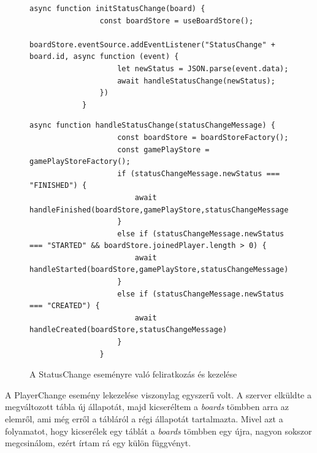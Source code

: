 \documentclass[a4paper,twoside]{article}
\begin{document}
\begin{figure}
	\caption{A StatusChange eseményre való feliratkozás és kezelése}
		\begin{minipage}{\textwidth}
			\begin{lstlisting}[style=javascriptStyle]
			async function initStatusChange(board) {
				const boardStore = useBoardStore();
				boardStore.eventSource.addEventListener("StatusChange" + board.id, async function (event) {
					let newStatus = JSON.parse(event.data);
					await handleStatusChange(newStatus);
				})
			}
			\end{lstlisting}
		\end{minipage}
		\begin{minipage}{\textwidth}
			\begin{lstlisting}[style=javascriptStyle]
				async function handleStatusChange(statusChangeMessage) {
					const boardStore = boardStoreFactory();
					const gamePlayStore = gamePlayStoreFactory();
					if (statusChangeMessage.newStatus === "FINISHED") {
						await handleFinished(boardStore,gamePlayStore,statusChangeMessage);
					}
					else if (statusChangeMessage.newStatus === "STARTED" && boardStore.joinedPlayer.length > 0) {
						await handleStarted(boardStore,gamePlayStore,statusChangeMessage)
					}
					else if (statusChangeMessage.newStatus === "CREATED") {
						await handleCreated(boardStore,statusChangeMessage)
					}
				}
			\end{lstlisting}
		\end{minipage}
	\label{statuschange}
\end{figure}

A PlayerChange esemény lekezelése viszonylag egyszerű volt. A szerver elküldte a megváltozott tábla új állapotát, majd kicseréltem a \textit{boards} tömbben arra az elemről, ami még erről a tábláról a régi állapotát tartalmazta. Mivel azt a folyamatot, hogy kicserélek egy táblát a \textit{boards} tömbben egy újra, nagyon sokszor megcsinálom, ezért írtam rá egy külön függvényt. 
\end{document}
